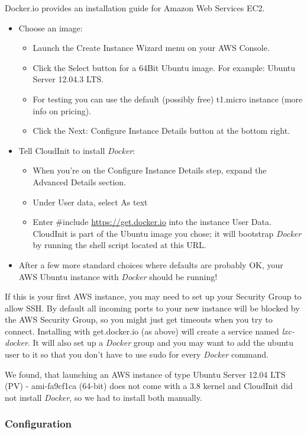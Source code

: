 \documentclass[captions=tableheading]{article}
\begin{document}
Docker.io provides an installation guide for Amazon Web Services EC2.
\begin{itemize}
\item Choose an image:
\begin{itemize}
\item Launch the Create Instance Wizard menu on your AWS Console.
\item Click the Select button for a 64Bit Ubuntu image. For example: Ubuntu Server 12.04.3 LTS.
\item For testing you can use the default (possibly free) t1.micro instance (more info on pricing).
\item Click the Next: Configure Instance Details button at the bottom right.
\end{itemize}
\item Tell CloudInit to install \emph{Docker}:
\begin{itemize}
\item When you're on the Configure Instance Details step, expand the Advanced Details section.
\item Under User data, select As text
\item Enter \#include \href{https://get.docker.io}{https://get.docker.io}  into the instance User Data. CloudInit is part of the Ubuntu image you chose; it will bootstrap \emph{Docker} by running the shell script located at this URL.
\end{itemize}
\item After a few more standard choices where defaults are probably OK, your AWS Ubuntu instance with \emph{Docker} should be running!
\end{itemize}
If this is your first AWS instance, you may need to set up your Security Group to allow SSH. By default all incoming ports to your new instance will be blocked by the AWS Security Group, so you might just get
timeouts when you try to connect. Installing with get.docker.io (as above) will create a service named \emph{lxc-docker}. It will also set up a \emph{Docker} group and you may want to add the ubuntu user to it so that you don't have to use sudo for every \emph{Docker} command. 

We found, that launching an AWS instance of type Ubuntu Server 12.04 LTS (PV) - ami-fa9cf1ca (64-bit) does not come with a 3.8 kernel and CloudInit did not install \emph{Docker}, so we had to install both manually.   
\subsubsection{Configuration}
\label{sec-2-1-5}
\end{document}

